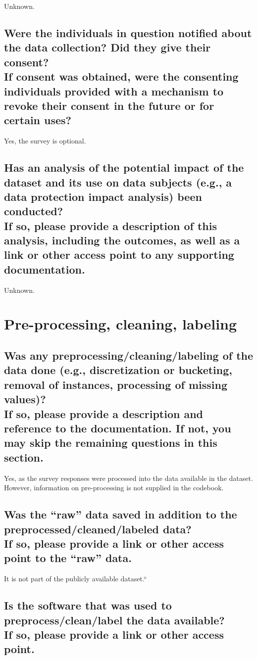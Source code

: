 \documentclass[letterpaper, 10 pt, conference]{ieeeconf}  %
\newcommand{\subtitle}[1]{{\\ \small \normalfont \color{purple} #1}}
\begin{document}
Unknown.

\subsection{Were the individuals in question notified about the data collection? Did they give their consent? \subtitle{If consent was obtained, were the consenting individuals provided with a mechanism to revoke their consent in the future or for certain uses?}}

Yes, the survey is optional. 

\subsection{Has an analysis of the potential impact of the dataset and its use on data subjects (e.g., a data protection impact analysis) been conducted? \subtitle{If so, please provide a description of this analysis, including the outcomes, as well as a link or other access point to any supporting documentation.}}

Unknown.

\section{Pre-processing, cleaning, labeling}

\subsection{Was any preprocessing/cleaning/labeling of the data done (e.g., discretization or bucketing, removal of instances, processing of missing values)? \subtitle{If so, please provide a description and reference to the documentation. If not, you may skip the remaining questions in this section.}}

Yes, as the survey responses were processed into the data available in the dataset. However, information on pre-processing is not supplied in the codebook. 

\subsection{Was the “raw” data saved in addition to the preprocessed/cleaned/labeled data? \subtitle{If so, please provide a link or other access point to the “raw” data. }}

It is not part of the publicly available dataset.``

\subsection{Is the software that was used to preprocess/clean/label the data available? \subtitle{If so, please provide a link or other access point.}}
\end{document}
